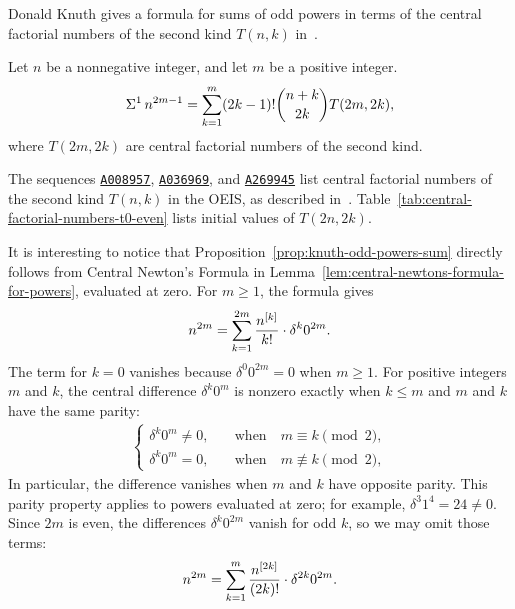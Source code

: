 Donald Knuth gives a formula for sums of odd powers in terms of the central factorial numbers of the second kind $T(n,k)$ in~\cite{knuth1993johann}.
\begin{proposition}
  \label{prop:knuth-odd-powers-sum}
  Let $n$ be a nonnegative integer, and let $m$ be a positive integer.
  \begin{align*}
    \Sigma^{1}\,{n}^{2m-1} = \sum_{k=1}^{m} (2k-1)! \binom{n+k}{2k} T(2m,2k),
  \end{align*}
  where $T(2m,2k)$ are central factorial numbers of the second kind.
\end{proposition}
The sequences \href{https://oeis.org/A008957}{\texttt{A008957}}, \href{https://oeis.org/A036969}{\texttt{A036969}}, and \href{https://oeis.org/A269945}{\texttt{A269945}} list central factorial numbers of the second kind $T(n,k)$ in the OEIS, as described in~\cite{sloane2003line}.
Table~\ref{tab:central-factorial-numbers-t0-even} lists initial values of $T(2n,2k)$.

It is interesting to notice that Proposition~\eqref{prop:knuth-odd-powers-sum}
directly follows
from Central Newton's Formula in Lemma~\eqref{lem:central-newtons-formula-for-powers},
evaluated
at zero.
For $m\geq 1$, the formula gives
\begin{align*}
  n^{2m} = \sum_{k=1}^{2m} \frac{n^{[k]}}{k!} \cdot \delta^{k} 0^{2m}.
\end{align*}
The term for $k=0$ vanishes because $\delta^{0} 0^{2m} = 0$ when $m\geq1$.
For positive integers $m$ and $k$, the central difference $\delta^k 0^m$ is nonzero exactly when $k\leq m$ and $m$ and $k$ have the same parity:
\begin{align*}
  \begin{cases}
    \delta^{k} 0^m \neq 0, \quad &\text{when} \quad m \equiv k \pmod{2}, \\
    \delta^{k} 0^m = 0, \quad &\text{when} \quad m \not\equiv k \pmod{2},
  \end{cases}
\end{align*}
In particular, the difference vanishes when $m$ and $k$ have opposite parity.
This parity property applies to powers evaluated at zero; for example, $\delta^{3}1^{4}=24\neq0$.
Since $2m$ is even, the differences $\delta^{k}0^{2m}$ vanish for odd $k$, so we may omit those terms:
\begin{align*}
  n^{2m} = \sum_{k=1}^{m} \frac{n^{[2k]}}{(2k)!} \cdot \delta^{2k} 0^{2m}.
\end{align*}
